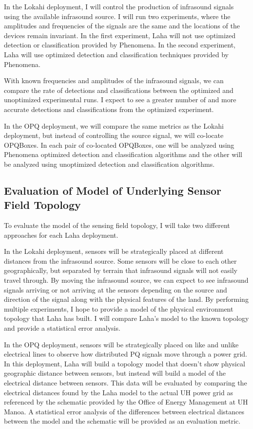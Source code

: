 In the Lokahi deployment, I will control the production of infrasound signals using the available infrasound source. I will run two experiments, where the amplitudes and frequencies of the signals are the same and the locations of the devices remain invariant. In the first experiment, Laha will not use optimized detection or classification provided by Phenomena. In the second experiment, Laha will use optimized detection and classification techniques provided by Phenomena. 

With known frequencies and amplitudes of the infrasound signals, we can compare the rate of detections and classifications between the optimized and unoptimized experimental runs. I expect to see a greater number of and more accurate detections and classifications from the optimized experiment.

In the OPQ deployment, we will compare the same metrics as the Lokahi deployment, but instead of controlling the source signal, we will co-locate OPQBoxes. In each pair of co-located OPQBoxes, one will be analyzed using Phenomena optimized detection and classification algorithms and the other will be analyzed using unoptimized detection and classification algorithms.

\subsection{Evaluation of Model of Underlying Sensor Field Topology}
To evaluate the model of the sensing field topology, I will take two different approaches for each Laha deployment.

In the Lokahi deployment, sensors will be strategically placed at different distances from the infrasound source. Some sensors will be close to each other geographically, but separated by terrain that infrasound signals will not easily travel through. By moving the infrasound source, we can expect to see infrasound signals arriving or not arriving at the sensors depending on the source and direction of the signal along with the physical features of the land. By performing multiple experiments, I hope to provide a model of the physical environment topology that Laha has built. I will compare Laha's model to the known topology and provide a statistical error analysis. 

In the OPQ deployment, sensors will be strategically placed on like and unlike electrical lines to observe how distributed PQ signals move through a power grid. In this deployment, Laha will build a topology model that doesn't show physical geographic distance between sensors, but instead will build a model of the electrical distance between sensors. This data will be evaluated by comparing the electrical distances found by the Laha model to the actual UH power grid as referenced by the schematic provided by the Office of Energy Management at UH Manoa. A statistical error analysis of the differences between electrical distances between the model and the schematic will be provided as an evaluation metric.
